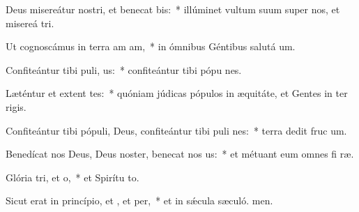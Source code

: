\item Deus misereátur nostri, et benecat bis:~* illúminet vultum suum super nos, et misereá tri.
\item Ut cognoscámus in terra am am,~* in ómnibus Géntibus salutá um.
\item Confiteántur tibi puli, us:~* confiteántur tibi pópu nes.
\item Læténtur et extent tes:~* quóniam júdicas pópulos in æquitáte, et Gentes in ter rigis.
\item Confiteántur tibi pópuli, Deus, confiteántur tibi puli nes:~* terra dedit fruc um.
\item Benedícat nos Deus, Deus noster, benecat nos us:~* et métuant eum omnes fi ræ.
\item Glória tri, et o,~* et Spirítu to.
\item Sicut erat in princípio, et , et per,~* et in sǽcula sæculó. men.
